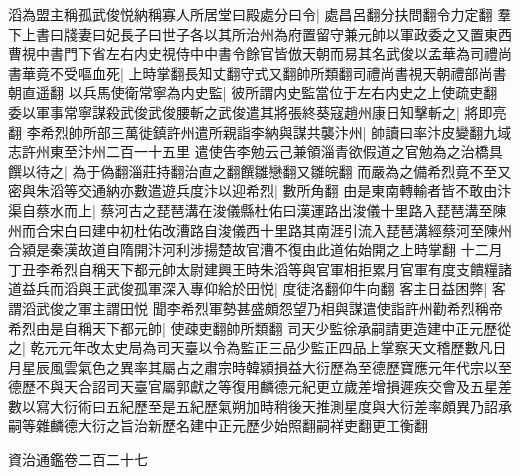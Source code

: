 滔為盟主稱孤武俊悦納稱寡人所居堂曰殿處分曰令|{
	處昌呂翻分扶問翻令力定翻}
羣下上書曰牋妻曰妃長子曰世子各以其所治州為府置留守兼元帥以軍政委之又置東西曹視中書門下省左右内史視侍中中書令餘官皆倣天朝而易其名武俊以孟華為司禮尚書華竟不受嘔血死|{
	上時掌翻長知丈翻守式又翻帥所類翻司禮尚書視天朝禮部尚書朝直遥翻}
以兵馬使衛常寧為内史監|{
	彼所謂内史監當位于左右内史之上使疏吏翻}
委以軍事常寧謀殺武俊武俊腰斬之武俊遣其將張終葵寇趙州康日知擊斬之|{
	將即亮翻}
李希烈帥所部三萬徙鎮許州遣所親詣李納與謀共襲汴州|{
	帥讀曰率汴皮變翻九域志許州東至汴州二百一十五里}
遣使告李勉云己兼領淄青欲假道之官勉為之治橋具饌以待之|{
	為于偽翻淄莊持翻治直之翻饌雛戀翻又雛皖翻}
而嚴為之備希烈竟不至又密與朱滔等交通納亦數遣遊兵度汴以迎希烈|{
	數所角翻}
由是東南轉輸者皆不敢由汴渠自蔡水而上|{
	蔡河古之琵琶溝在浚儀縣杜佑曰漢運路出浚儀十里路入琵琶溝至陳州而合宋白曰建中初杜佑改漕路自浚儀西十里路其南涯引流入琵琶溝經蔡河至陳州合潁是秦漢故道自隋開汴河利涉揚楚故官漕不復由此道佑始開之上時掌翻}
十二月丁丑李希烈自稱天下都元帥太尉建興王時朱滔等與官軍相拒累月官軍有度支饋糧諸道益兵而滔與王武俊孤軍深入專仰給於田悦|{
	度徒洛翻仰牛向翻}
客主日益困弊|{
	客謂滔武俊之軍主謂田悦}
聞李希烈軍勢甚盛頗怨望乃相與謀遣使詣許州勸希烈稱帝希烈由是自稱天下都元帥|{
	使疎吏翻帥所類翻}
司天少監徐承嗣請更造建中正元歷從之|{
	乾元元年改太史局為司天臺以令為監正三品少監正四品上掌察天文稽歷數凡日月星辰風雲氣色之異率其屬占之肅宗時韓潁損益大衍歷為至德歷寶應元年代宗以至德歷不與天合詔司天臺官屬郭獻之等復用麟德元紀更立歲差增損遲疾交會及五星差數以寫大衍術曰五紀歷至是五紀歷氣朔加時稍後天推測星度與大衍差率頗異乃詔承嗣等雜麟德大衍之旨治新歷名建中正元歷少始照翻嗣祥吏翻更工衡翻}


資治通鑑卷二百二十七
